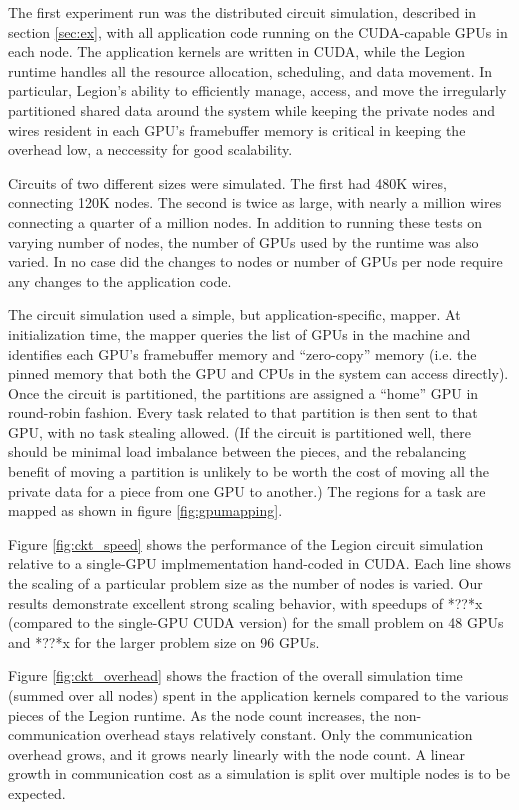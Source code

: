 The first experiment run was the distributed circuit simulation, described in 
section \ref{sec:ex}, with all application code running on the CUDA-capable GPUs in
each node.  The application kernels are written in CUDA, while the Legion runtime
handles all the resource allocation, scheduling, and data movement.  In particular,
Legion's ability to efficiently manage, access, and move the irregularly partitioned
shared data around the system while keeping the private nodes and wires resident in
each GPU's framebuffer memory is critical in keeping the overhead low, a neccessity
for good scalability.

Circuits of two different sizes were simulated.  The first had 480K wires, connecting
120K nodes.  The second is twice as large, with nearly a million wires connecting a
quarter of a million nodes.  In addition to running these tests on varying number of
nodes, the number of GPUs used by the runtime was also varied.  In no case did the 
changes to nodes or number of GPUs per node require any changes to the application code.

The circuit simulation used a simple, but application-specific, mapper.  At initialization
time, the mapper queries the list of GPUs in the machine and identifies each GPU's
framebuffer memory and ``zero-copy'' memory (i.e. the pinned memory that both the GPU and
CPUs in the system can access directly).  Once the circuit is partitioned, the partitions
are assigned a ``home'' GPU in round-robin fashion.  Every task related to that partition is
then sent to that GPU, with no task stealing allowed.  (If the circuit is partitioned well,
there should be minimal load imbalance between the pieces, and the rebalancing benefit of 
moving a partition is unlikely to be worth the cost of moving all the 
private data for a piece from one GPU to another.)  The regions for a task are mapped as 
shown in figure \ref{fig:gpumapping}.

Figure \ref{fig:ckt_speed} shows the performance of the Legion circuit simulation relative
to a single-GPU implmementation hand-coded in CUDA.  Each line shows the scaling of
a particular problem size as the number of nodes is varied.  Our results demonstrate
excellent strong scaling behavior, with speedups of *??*x (compared to the single-GPU CUDA
version) for the small problem on 48 GPUs and *??*x for the larger problem size on 96 GPUs.

Figure \ref{fig:ckt_overhead} shows the fraction of the overall simulation time (summed over
all nodes) spent in the application kernels compared to the various pieces of the Legion
runtime.  As the node count increases, the non-communication overhead stays relatively constant.
Only the communication overhead grows, and it grows nearly linearly with the node count.
A linear growth in communication cost as a simulation is split over multiple nodes is to
be expected.

